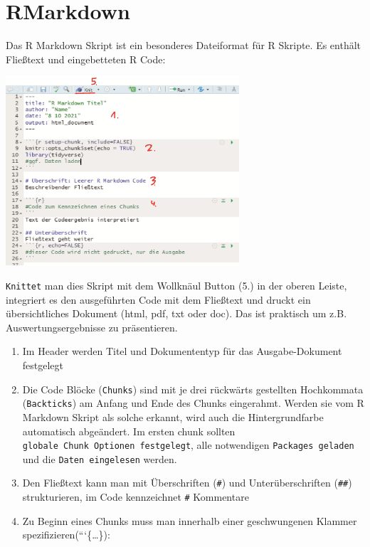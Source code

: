 \documentclass[
]{book}
\providecommand{\tightlist}{%
  \setlength{\itemsep}{0pt}\setlength{\parskip}{0pt}}
\theoremstyle{definition}
\theoremstyle{definition}
\theoremstyle{definition}
\theoremstyle{definition}
\theoremstyle{remark}
\begin{document}
\hypertarget{rmarkdown}{%
\section{RMarkdown}\label{rmarkdown}}

Das R Markdown Skript ist ein besonderes Dateiformat für R Skripte. Es enthält Fließtext und eingebetteten R Code:

\includegraphics[width=0.65\textwidth,height=\textheight]{_bookdown_files/_main_files/figure-html/RMarkmitNum.png}

\texttt{Knittet} man dies Skript mit dem Wollknäul Button (5.) in der oberen Leiste, integriert es den ausgeführten Code mit dem Fließtext und druckt ein übersichtliches Dokument (html, pdf, txt oder doc). Das ist praktisch um z.B. Auswertungsergebnisse zu präsentieren.

\begin{enumerate}
\def\labelenumi{\arabic{enumi}.}
\tightlist
\item
  Im Header werden Titel und Dokumententyp für das Ausgabe-Dokument festgelegt
\item
  Die Code Blöcke (\texttt{Chunks}) sind mit je drei rückwärts gestellten Hochkommata (\texttt{Backticks}) am Anfang und Ende des Chunks eingerahmt. Werden sie vom R Markdown Skript als solche erkannt, wird auch die Hintergrundfarbe automatisch abgeändert. Im ersten chunk sollten \texttt{globale\ Chunk\ Optionen\ festgelegt}, alle notwendigen \texttt{Packages\ geladen} und die \texttt{Daten\ eingelesen} werden.
\item
  Den Fließtext kann man mit Überschriften (\texttt{\#}) und Unterüberschriften (\texttt{\#\#}) strukturieren, im Code kennzeichnet \texttt{\#}
  Kommentare
\item
  Zu Beginn eines Chunks muss man innerhalb einer geschwungenen Klammer spezifizieren(```\{\ldots\}):
\end{enumerate}
\end{document}
